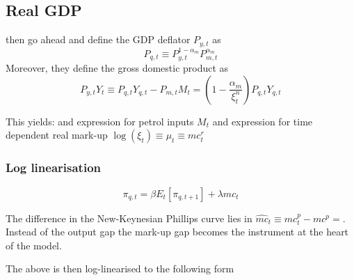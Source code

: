 \documentclass[12pt,a4paper,english]{article} %
\begin{document}
	\subsection{Real GDP}
	
	\cite{blanchard_macroeconomic_2007} then go ahead and define the GDP deflator $P_{y,t}$ as
	\begin{equation}
		P_{q,t} \equiv P_{y,t}^{1-\alpha_m} P_{m,t}^{\alpha_m}
	\end{equation}
	Moreover, they define the gross domestic product as 
	\begin{equation}
		P_{y,t} Y_t \equiv P_{q,t} Y_{q,t} - P_{m,t} M_t = \left( 1 - \frac{\alpha_m}{\xi_t^n} \right) P_{q,t} Y_{q,t}
	\end{equation}
	
	This yields:
	and expression for petrol inputs $M_t$
	and expression for time dependent real mark-up $\log(\xi_t) \equiv \mu_t \equiv mc_t^r$
		
	\subsubsection{Log linearisation}
	\begin{equation}
		\pi_{q,t} = \beta E_t [\pi_{q,t+1}] + \lambda \hat{mc}_{t}
	\end{equation}
	
	The difference in the New-Keynesian Phillips curve lies in $\hat{mc}_t \equiv mc_t^p - mc^p = $. Instead of the output gap the mark-up gap becomes the instrument at the heart of the model.
	
	The above is then log-linearised to the following form
	
\end{document}
